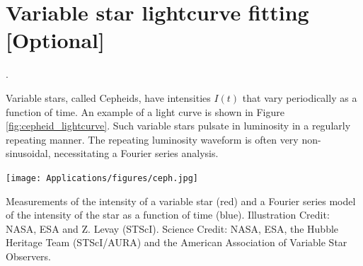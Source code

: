 
%    

\newpage
\section{Variable star lightcurve fitting [Optional]}
.

Variable stars, called Cepheids, have intensities $I(t)$ that vary
periodically as a function of time. An example of a light curve is
shown in Figure \ref{fig:cepheid_lightcurve}. Such variable stars
pulsate in luminosity in a regularly repeating manner. The repeating
luminosity waveform is often very non-sinusoidal, necessitating a
Fourier series analysis.

\begin{marginfigure}
\begin{center}
\texttt{[image: Applications/figures/ceph.jpg]}
\end{center}
\caption{Measurements of the intensity of a variable star (red) and a Fourier series model of the intensity of the star as a function of time (blue). Illustration Credit: NASA, ESA and Z. Levay (STScI). Science Credit: NASA, ESA, the Hubble Heritage Team (STScI/AURA) and the American Association of Variable Star Observers.}
\label{fig:cepheid_lightcurve}
\end{marginfigure}

